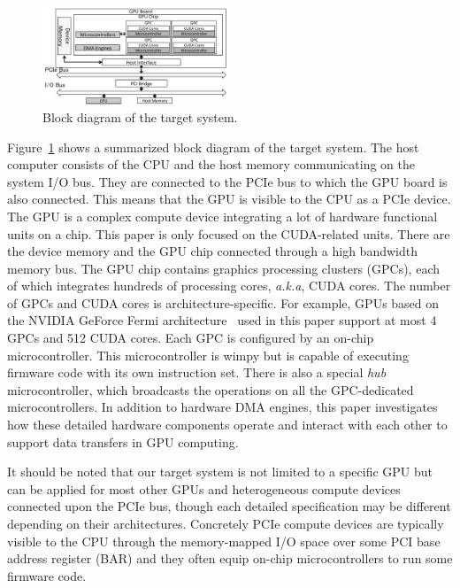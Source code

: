 \begin{figure}[!t]
 \centering
 \includegraphics[width=0.49\textwidth]{figure/Method/pci_gpu.pdf}
 \caption{Block diagram of the target system.}
 \label{fig:pci_gpu}
\end{figure}

Figure~\ref{fig:pci_gpu} shows a summarized block diagram of the target
system.
The host computer consists of the CPU and the host memory communicating
on the system I/O bus.
They are connected to the PCIe bus to which the GPU board is also
connected.
This means that the GPU is visible to the CPU as a PCIe device.
The GPU is a complex compute device integrating a lot of hardware
functional units on a chip.
This paper is only focused on the CUDA-related units.
There are the device memory and the GPU chip connected through a high
bandwidth memory bus.
The GPU chip contains graphics processing clusters (GPCs), each of which
integrates hundreds of processing cores, \textit{a.k.a}, CUDA cores.
The number of GPCs and CUDA cores is architecture-specific.
For example, GPUs based on the NVIDIA GeForce Fermi
architecture~\cite{NVIDIA_Fermi} used in this paper support at most 4
GPCs and 512 CUDA cores.
Each GPC is configured by an on-chip microcontroller.
This microcontroller is wimpy but is capable of executing firmware code
with its own instruction set.
There is also a special \textit{hub} microcontroller, which broadcasts the
operations on all the GPC-dedicated microcontrollers.
In addition to hardware DMA engines, this paper investigates how these
detailed hardware components operate and interact with each other to
support data transfers in GPU computing.

It should be noted that our target system is not limited to a specific
GPU but can be applied for most other GPUs and heterogeneous compute
devices connected upon the PCIe bus, though each detailed specification
may be different depending on their architectures.
Concretely PCIe compute devices are typically visible to the CPU through
the memory-mapped I/O space over some PCI base address register (BAR)
and they often equip on-chip microcontrollers to run some firmware
code.
